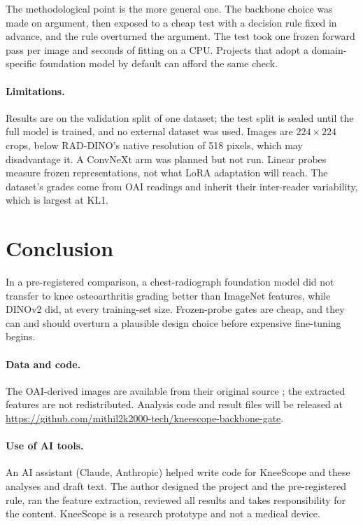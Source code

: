 \documentclass[11pt]{article}
\begin{document}
The methodological point is the more general one. The backbone choice was made on argument, then exposed to a cheap test with a decision
rule fixed in advance, and the rule overturned the argument. The test took one frozen forward pass per image and seconds of fitting on a
CPU. Projects that adopt a domain-specific foundation model by default can afford the same check.

\paragraph{Limitations.} Results are on the validation split of one dataset; the test split is sealed until the full model is trained,
and no external dataset was used. Images are \(224\times224\) crops, below RAD-DINO's native resolution of 518 pixels, which may
disadvantage it. A ConvNeXt arm was planned but not run. Linear probes measure frozen representations, not what LoRA adaptation will
reach. The dataset's grades come from OAI readings and inherit their inter-reader variability, which is largest at KL1.

\section{Conclusion}
In a pre-registered comparison, a chest-radiograph foundation model did not transfer to knee osteoarthritis grading better than ImageNet
features, while DINOv2 did, at every training-set size. Frozen-probe gates are cheap, and they can and should overturn a plausible
design choice before expensive fine-tuning begins.

\paragraph{Data and code.} The OAI-derived images are available from their original source \cite{chen2018data}; the extracted features
are not redistributed. Analysis code and result files will be released at
\newline\url{https://github.com/mithil2k2000-tech/kneescope-backbone-gate}.

\paragraph{Use of AI tools.} An AI assistant (Claude, Anthropic) helped write code for KneeScope and these analyses and draft text. The
author designed the project and the pre-registered rule, ran the feature extraction, reviewed all results and takes responsibility for
the content. KneeScope is a research prototype and not a medical device.



\end{document}
